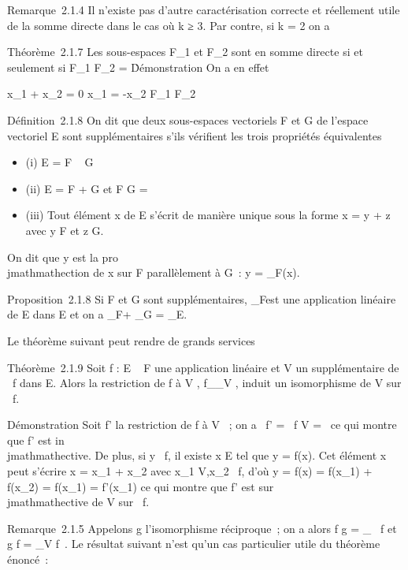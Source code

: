 \documentclass[]{article}
\begin{document}
Remarque~2.1.4 Il n'existe pas d'autre caractérisation correcte et
réellement utile de la somme directe dans le cas où k ≥ 3. Par contre,
si k = 2 on a

Théorème~2.1.7 Les sous-espaces F_1 et F_2 sont en
somme directe si et seulement si F_1 \bigcap F_2 =
\0\.

Démonstration On a en effet

x_1 + x_2 = 0 \Leftrightarrow
x_1 = -x_2 \in F_1 \bigcap F_2

Définition~2.1.8 On dit que deux sous-espaces vectoriels F et G de
l'espace vectoriel E sont supplémentaires s'ils vérifient les trois
propriétés équivalentes

\begin{itemize}
\itemsep1pt\parskip0pt
\item
  (i) E = F \oplus~ G
\item
  (ii) E = F + G et F \bigcap G = \0\
\item
  (iii) Tout élément x de E s'écrit de manière unique sous la forme x =
  y + z avec y \in F et z \in G.
\end{itemize}

On dit que y est la pro\\jmathmathection de x sur F parallèlement à G~: y =
\pi_F\parallelG(x).

Proposition~2.1.8 Si F et G sont supplémentaires, \pi_F\parallelG est une
application linéaire de E dans E et on a \pi_F\parallelG + \pi_G\parallelF
= \mathrmId_E.

Le théorème suivant peut rendre de grands services

Théorème~2.1.9 Soit f : E \rightarrow~ F une application linéaire et V un
supplémentaire de
\mathrmKer~f dans E. Alors
la restriction de f à V , f__V , induit un
isomorphisme de V sur
\mathrmIm~f.

Démonstration Soit f' la restriction de f à V ~; on a
\mathrmKer~f'
= \mathrmKer~f \bigcap V =
\0\ ce qui montre que f' est
in\\jmathmathective. De plus, si y
\in\mathrmIm~f, il existe x \in
E tel que y = f(x). Cet élément x peut s'écrire x = x_1 +
x_2 avec x_1 \in V,x_2
\in\mathrmKer~f, d'où y = f(x)
= f(x_1) + f(x_2) = f(x_1) = f'(x_1)
ce qui montre que f' est sur\\jmathmathective de V sur
\mathrmIm~f.

Remarque~2.1.5 Appelons g l'isomorphisme réciproque~; on a alors f \cdot g
=
\mathrmId_\mathrmIm~
f et g \cdot f = \pi_V
\parallel\mathrmKer f~. Le
résultat suivant n'est qu'un cas particulier utile du théorème énoncé~:
\end{document}
